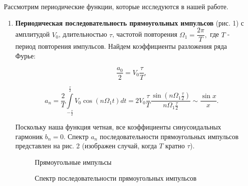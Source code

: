 \documentclass[a4paper,12pt]{article}
\theoremstyle{definition}
\begin{document}
	
	
	Рассмотрим периодические функции, которые исследуются в нашей
	работе.
	
	\begin{enumerate}
		
	\item 	\textbf{Периодическая последовательность прямоугольных импульсов} (рис. 1) с амплитудой $V_{0}$, длительностью $\tau$, частотой повторения $\Omega_{1}=\dfrac{2\pi}{T},$ где $T$ - период повторения импульсов. Найдем коэффициенты разложения ряда Фурье:
	
	$$\dfrac{a_{0}}{2}=V_{0}\dfrac{\tau}{T},$$

 \begin{equation}
     a_{n}=\dfrac{2}{T}\int\limits_{-\frac{\tau}{2}}^{\frac{\tau}{2}}V_{0}\cos(n \Omega_{1} t)dt=2V_{0}\dfrac{\tau}{T}\dfrac{\sin(n \Omega_{1} \frac{\tau}{2})}{n\Omega_{1}\frac{\tau}{2}} \sim \dfrac{\sin x}{x}.
    \label{eq4}
 \end{equation}

	
	Поскольку наша функция четная, все коэффициенты синусоидальных гармоник $b_{n}=0$. Спектр $a_{n}$ последовательности прямоугольных импульсов представлен на рис. 2 (изображен случай, когда $T$ кратно $\tau$).
		
		
		\begin{figure}[h]
			\begin{minipage}[h]{0.5\linewidth}
				\caption{Прямоугольные импульсы}
			\end{minipage}
			\begin{minipage}[h]{0.5\linewidth}
				\caption{Спектр последовательности прямоугольных импульсов}
			\end{minipage}
		\end{figure}
	

\end{enumerate}
\end{document}
